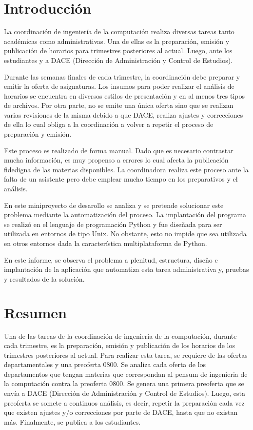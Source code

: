 \documentclass[]{article}
\begin{document}
{
\hypersetup{linkcolor=black}
\setcounter{tocdepth}{3}
\tableofcontents
}

\newpage
\section{Introducción}\label{introducciuxf3n}

La coordinación de ingeniería de la computación realiza diversas tareas
tanto académicas como administrativas. Una de ellas es la preparación,
emisión y publicación de horarios para trimestres posteriores al actual.
Luego, ante los estudiantes y a DACE (Dirección de Administración y
Control de Estudios).

Durante las semanas finales de cada trimestre, la coordinación debe
preparar y emitir la oferta de asignaturas. Los insumos para poder
realizar el análisis de horarios se encuentra en diversos estilos de
presentación y en al menos tres tipos de archivos. Por otra parte, no se
emite una única oferta sino que se realizan varias revisiones de la
misma debido a que DACE, realiza ajustes y correcciones de ella lo cual
obliga a la coordinación a volver a repetir el proceso de preparación y
emisión.

Este proceso es realizado de forma manual. Dado que es necesario
contrastar mucha información, es muy propenso a errores lo cual afecta
la publicación fidedigna de las materias disponibles. La coordinadora
realiza este proceso ante la falta de un asistente pero debe emplear
mucho tiempo en los preparativos y el análisis.

En este miniproyecto de desarollo se analiza y se pretende solucionar
este problema mediante la automatización del proceso. La implantación
del programa se realizó en el lenguaje de programación Python y fue
diseñada para ser utilizada en entornos de tipo Unix. No obstante, esto
no impide que sea utilizada en otros entornos dada la característica
multiplataforma de Python.

En este informe, se observa el problema a plenitud, estructura, diseño e
implantación de la aplicación que automatiza esta tarea administrativa
y, pruebas y resultados de la solución.

\section{Resumen}\label{resumen}

Una de las tareas de la coordinación de ingenieria de la computación,
durante cada trimestre, es la preparación, emisión y publicación de los
horarios de los trimestres posteriores al actual. Para realizar esta
tarea, se requiere de las ofertas departamentales y una preoferta 0800.
Se analiza cada oferta de los departamentos que tengan materias que
correspondan al pensum de ingenieria de la computación contra la
preoferta 0800. Se genera una primera preoferta que se envía a DACE
(Dirección de Administración y Control de Estudios). Luego, esta
preoferta se somete a continuos análisis, es decir, repetir la
preparación cada vez que existen ajustes y/o correcciones por parte de
DACE, hasta que no existan más. Finalmente, se publica a los
estudiantes.
\end{document}
